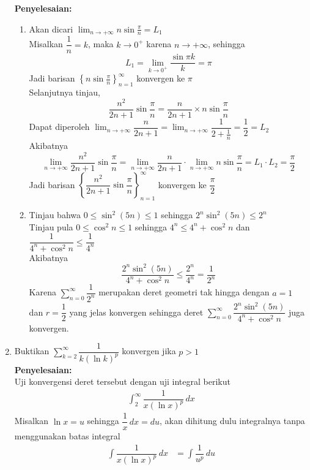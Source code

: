 \documentclass{article}
\begin{document}
\begin{enumerate}
\begin{enumerate}
	\end{enumerate}
	\textbf{Penyelesaian:}
	\begin{enumerate}
		\item Akan dicari $\displaystyle \lim_{n\rightarrow +\infty} n\sin \frac{\pi}{n}=L_1$\\ Misalkan $\dfrac{1}{n}=k$, maka $k\rightarrow 0^+$ karena $n\rightarrow +\infty$, sehingga
		$$ L_1=\lim_{k\rightarrow 0^+} \dfrac{\sin \pi k}{k} = \pi $$ 
		Jadi barisan $\left\{ n\sin\frac{\pi}{n}\right\}^\infty_{n=1}$ konvergen ke $\pi$\\
		Selanjutnya tinjau, 
		$$ \dfrac{n^2}{2n+1}\sin \frac{\pi}{n}=\dfrac{n}{2n+1}\times n\sin\frac{\pi}{n}$$ 
		Dapat diperoleh $\displaystyle \lim_{n\rightarrow +\infty} \dfrac{n}{2n+1}=\lim_{n\rightarrow +\infty} \dfrac{1}{2+\frac{1}{n}}=\dfrac{1}{2}= L_2$\\
		Akibatnya $$ \lim_{n\rightarrow +\infty} \dfrac{n^2}{2n+1}\sin \frac{\pi}{n} = \lim_{n\rightarrow +\infty} \dfrac{n}{2n+1}\cdot \lim_{n\rightarrow +\infty} n\sin \frac{\pi}{n} = L_1\cdot L_2=\dfrac{\pi}{2} $$
		Jadi barisan $\left\{ \dfrac{n^2}{2n+1}\sin\dfrac{\pi}{n}\right\}^\infty_{n=1}$ konvergen ke $\dfrac{\pi}{2}$
		\item Tinjau bahwa $0\leq \sin^2(5n)\leq 1$ sehingga $2^n\sin^2(5n)\leq 2^n$\\
		Tinjau pula $0\leq \cos^2 n\leq 1$ sehingga $4^n\leq 4^n+\cos^2 n$ dan $\dfrac{1}{4^n+\cos^2 n}\leq \dfrac{1}{4^n}$\\
		Akibatnya 
		$$ \dfrac{2^n\sin^2(5n)}{4^n+\cos^2 n} \leq \dfrac{2^n}{4^n} = \dfrac{1}{2^n} $$
		Karena $\displaystyle \sum_{n=0}^\infty \dfrac{1}{2^n}$ merupakan deret geometri tak hingga dengan $a=1$ dan $r=\dfrac{1}{2}$ yang jelas konvergen sehingga deret $\displaystyle \sum_{n=0}^\infty \dfrac{2^n\sin^2(5n)}{4^n+\cos^2 n}$ juga konvergen.
	\end{enumerate}
	\item Buktikan $\displaystyle \sum_{k=2}^\infty \dfrac{1}{k(\ln k)^p}$ konvergen jika $p>1$\\
	\textbf{Penyelesaian:}\\
	Uji konvergensi deret tersebut dengan uji integral berikut
	\begin{align*}
	\int_2^\infty \dfrac{1}{x(\ln x)^p}\, dx
	\end{align*}
	Misalkan $\ln x=u$ sehingga $\dfrac{1}{x}\, dx=du$, akan dihitung dulu integralnya tanpa menggunakan batas integral
	\begin{align*}
	\int \dfrac{1}{x(\ln x)^p}\, dx &= \int \dfrac{1}{u^p} \,du\\

\end{align*}
\end{enumerate}
\end{document}
